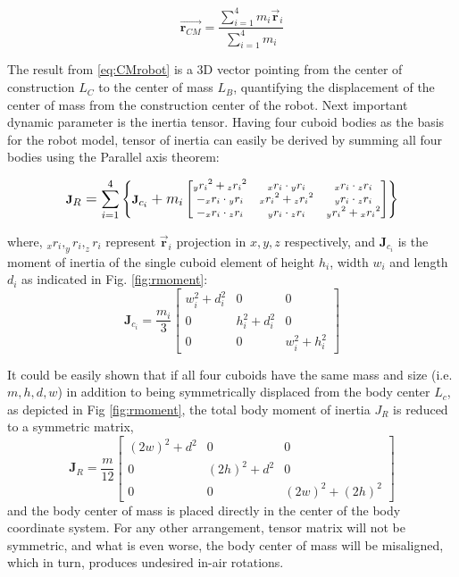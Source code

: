 \begin{equation}\label{eq:CMrobot}
\vec{\textbf{r}_{CM}}=\frac{\sum_{i=1}^{4}m_i\vec{\textbf{r}}_i}{\sum_{i=1}^{4}m_i}
\end{equation}

The result from \eqref{eq:CMrobot} is a 3D vector pointing from the center of construction $L_C$ to the center of mass $L_B$, quantifying the displacement of the center of mass from the construction center of the robot. Next important dynamic parameter is the inertia tensor. Having four cuboid bodies as the basis for the robot model, tensor of inertia can easily be derived by summing all four bodies using the Parallel axis theorem:

\begin{equation}
\footnotesize
\textbf{J}_R=\sum_{i=1}^{4}\left \{\textbf{J}_{c_i}+m_i\begin{bmatrix}
{_yr_i}^2+{_zr_i}^2 & {_xr_i}\cdot {_yr_i} & {_xr_i}\cdot {_zr_i} \\ 
-{_xr_i}\cdot {_yr_i} & {_xr_i}^2+{_zr_i}^2 & {_yr_i}\cdot {_zr_i}\\ 
-{_xr_i}\cdot {_zr_i} & {_yr_i}\cdot {_zr_i} & {_yr_i}^2+{_xr_i}^2
\end{bmatrix} \right \}
\normalsize
\end{equation}

where, $_xr_i, _yr_i, _zr_i$ represent $\vec{\textbf{r}}_i$ projection in $x,y,z$ respectively, and $\textbf{J}_{c_i}$ is the moment of inertia of the single cuboid element of height $h_i$, width $w_i$ and length $d_i$ as indicated in Fig. \ref{fig:rmoment}:
\begin{equation}
\textbf{J}_{c_i}=\frac{m_i}{3}\begin{bmatrix}
w_i^2+d_i^2 &0&0 \\ 
0 &h_i^2+d_i^2&0\\ 
0 &0& w_i^2+h_i^2
\end{bmatrix}
\end{equation} 

It could be easily shown that if all four cuboids have the same mass and size (i.e. $m,h,d,w$) in addition to being symmetrically displaced from the body center $L_c$, as depicted in Fig \ref{fig:rmoment}, the total body moment of inertia $J_R$ is reduced to a symmetric matrix,
\begin{equation}
\textbf{J}_{R}=\frac{m}{12}\begin{bmatrix}
(2w)^2+d^2 &0&0 \\ 
0 &(2h)^2+d^2&0\\ 
0 &0& (2w)^2+(2h)^2
\end{bmatrix}
\end{equation} 
and the body center of mass is placed directly in the center of the body coordinate system. For any other arrangement, tensor matrix will not be symmetric, and what is even worse, the body center of mass will be misaligned, which in turn, produces undesired in-air rotations.

